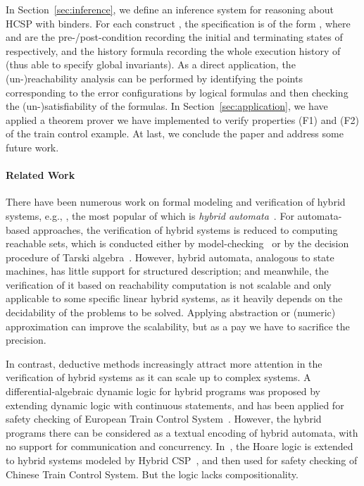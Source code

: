 \documentclass{llncs}
\begin{document}
In Section~\ref{sec:inference}, we define an inference system for reasoning about HCSP with binders.
For each construct , the specification is of the form ,
where  and  are the pre-/post-condition recording the initial and terminating states of
 respectively,  and  the history formula recording the whole
execution history of  (thus able to specify global invariants).
As a direct application, the (un-)reachability analysis
can be performed
by identifying the points corresponding
to the error configurations by logical formulas and then checking the (un-)satisfiability of the formulas.
In  Section~\ref{sec:application}, we have applied a theorem prover we have implemented to verify properties (F1) and (F2) of the train control example.
At last, we conclude the paper and address some future work.

\paragraph{\textbf{Related Work} }

There have been numerous work on formal modeling and verification of hybrid systems, e.g., \cite{Alur:1992,Manna93,Henzinger96,LSVW96,LPY02}, the most popular of which is {\em hybrid automata}~\cite{Alur:1992,Manna93,Henzinger96}. For
 automata-based approaches, the verification of hybrid systems is reduced to computing reachable sets,
 which is conducted either by model-checking~\cite{Alur:1992} or by the decision procedure of Tarski algebra~\cite{LPY02}. However,
  hybrid automata, analogous to state machines, has
  little support for structured description; and meanwhile,
   the verification of it based on reachability computation is not scalable and
   only applicable to some specific linear hybrid systems,  as
   it heavily depends on the decidability of the problems to be solved.
Applying abstraction or (numeric) approximation \cite{EClarke03,ADI06,ABDM00}  can improve the scalability,
but as a pay we have to sacrifice the precision.



 In contrast, deductive methods increasingly attract more attention in the verification
   of hybrid systems as it can scale up to complex systems.
  A differential-algebraic dynamic logic for hybrid programs \cite{Platzer10} was proposed by extending
dynamic logic with continuous statements, and has been applied for safety checking of European Train Control
System~\cite{PQ09}. However, the hybrid programs there can be considered as a textual encoding of hybrid automata,
with no support for communication and concurrency.
In~\cite{LLQZ10,ZWZictac}, the Hoare logic is extended to hybrid systems
modeled by Hybrid CSP~\cite{Jifeng:1994,Zhou:1996}, and then used for safety checking of
Chinese Train Control System. But the logic lacks compositionality.
\end{document}
